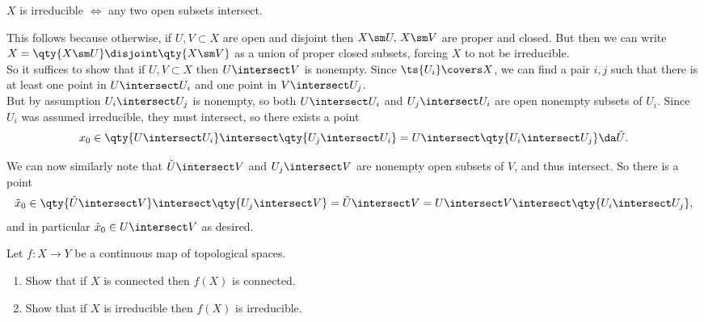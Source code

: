 \begin{solution}[b]

\begin{claim}

\(X\) is irreducible \(\iff\) any two open subsets intersect.

\end{claim}

This follows because otherwise, if \(U, V \subset X\) are open and
disjoint then \(X\sm U,\, X\sm V\) are proper and closed. But then we
can write \(X = \qty{X\sm U} \disjoint \qty{X\sm V}\) as a union of
proper closed subsets, forcing \(X\) to not be irreducible.\\

So it suffices to show that if \(U, V\subset X\) then \(U\intersect V\)
is nonempty. Since \(\ts{U_i} \covers X\), we can find a pair \(i, j\)
such that there is at least one point in \(U\intersect U_i\) and one
point in \(V \intersect U_j\).\\

But by assumption \(U_i\intersect U_j\) is nonempty, so both
\(U\intersect U_i\) and \(U_j \intersect U_i\) are open nonempty subsets
of \(U_i\). Since \(U_i\) was assumed irreducible, they must intersect,
so there exists a point
\begin{align*}  
x_0 \in \qty{U\intersect U_i} \intersect \qty{U_j \intersect U_i} = U\intersect \qty{U_i \intersect U_j} \da \tilde U
.\end{align*}

We can now similarly note that \(\tilde U \intersect V\) and
\(U_j \intersect V\) are nonempty open subsets of \(V\), and thus
intersect. So there is a point
\begin{align*}  
\tilde x_0 \in \qty{\tilde U \intersect V} \intersect \qty{U_j \intersect V} = \tilde U\intersect V = U\intersect V \intersect \qty{U_i \intersect U_j}
,\end{align*} and in particular \(\tilde x_0 \in U\intersect V\) as
desired.

\end{solution}

\begin{exercise}[Gathmann 2.22]

Let \(f:X\to Y\) be a continuous map of topological spaces.

\begin{enumerate}
\def\labelenumi{\alph{enumi}.}
\item
  Show that if \(X\) is connected then \(f(X)\) is connected.
\item
  Show that if \(X\) is irreducible then \(f(X)\) is irreducible.
\end{enumerate}

\end{exercise}

